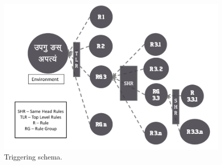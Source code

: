 \documentclass[11pt]{article}
\begin{document}
\begin{figure}[h]
    \centering
	\includegraphics[width=\textwidth]{fullImp}
    \caption{ Triggering schema.}
    \label{fig:fullImp}
\end{figure}


\\
\end{document}
